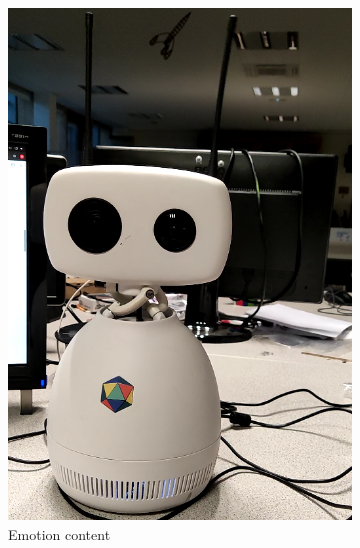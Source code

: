\documentclass[a4paper,french]{article}
\begin{document}
\begin{figure}[!ht]
\begin{subfigure}{0.25\textwidth}
        \includegraphics[width=\textwidth]{figures/content.png}
        \caption{Emotion content}
        \label{content}
    \end{subfigure}
    \begin{subfigure}{0.25\textwidth}

\end{subfigure}
\end{figure}
\end{document}

